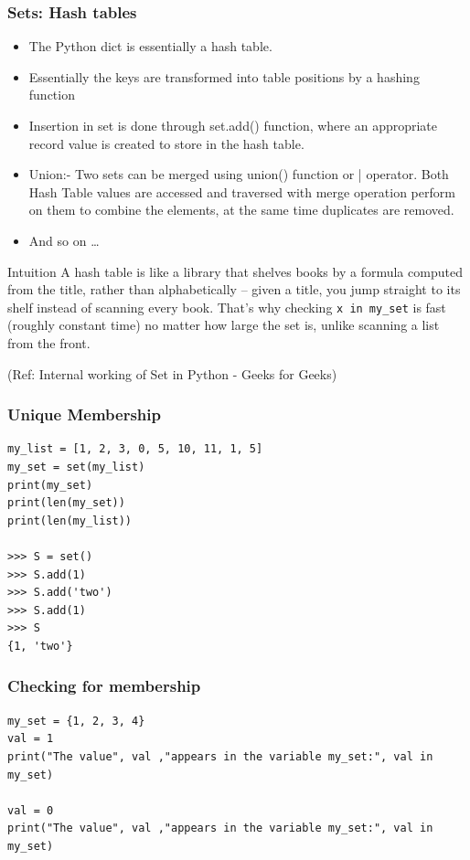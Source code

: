 \begin{frame}[fragile]\frametitle{Sets: Hash tables}
  \begin{itemize}
  \item The Python dict is essentially a hash table. 
  \item Essentially the keys are transformed into table positions by a hashing function
\item Insertion in set is done through set.add() function, where an appropriate record value is created to store in the hash table.
\item Union:- Two sets can be merged using union() function or | operator. Both Hash Table values are accessed and traversed with merge operation perform on them to combine the elements, at the same time duplicates are removed.
\item And so on \ldots

  \end{itemize}
  \begin{block}{Intuition}
  A hash table is like a library that shelves books by a formula computed from the title, rather than alphabetically -- given a title, you jump straight to its shelf instead of scanning every book. That's why checking \texttt{x in my\_set} is fast (roughly constant time) no matter how large the set is, unlike scanning a list from the front.
  \end{block}

  \tiny{(Ref: Internal working of Set in Python - Geeks for Geeks)}
\end{frame}


\begin{frame}[fragile]\frametitle{Unique Membership} 

\begin{lstlisting}
my_list = [1, 2, 3, 0, 5, 10, 11, 1, 5]
my_set = set(my_list)
print(my_set)
print(len(my_set))
print(len(my_list))

>>> S = set()
>>> S.add(1)
>>> S.add('two')
>>> S.add(1)
>>> S
{1, 'two'}
\end{lstlisting}

\end{frame}

\begin{frame}[fragile]\frametitle{Checking for membership}
\begin{lstlisting}
my_set = {1, 2, 3, 4}
val = 1
print("The value", val ,"appears in the variable my_set:", val in my_set)

val = 0
print("The value", val ,"appears in the variable my_set:", val in my_set)
\end{lstlisting}

\end{frame}

